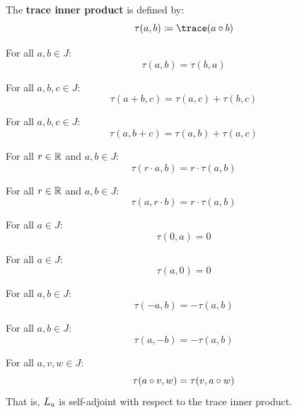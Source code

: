 \begin{definition}[traceInner]
The \textbf{trace inner product} is defined by:
\[ \tau(a, b) \defas \trace(a \jmul b) \]
\end{definition}

\begin{theorem}
For all $a, b \in J$:
\[ \tau(a, b) = \tau(b, a) \]
\end{theorem}

\begin{theorem}
For all $a, b, c \in J$:
\[ \tau(a + b, c) = \tau(a, c) + \tau(b, c) \]
\end{theorem}

\begin{theorem}
For all $a, b, c \in J$:
\[ \tau(a, b + c) = \tau(a, b) + \tau(a, c) \]
\end{theorem}

\begin{theorem}
For all $r \in \mathbb{R}$ and $a, b \in J$:
\[ \tau(r \cdot a, b) = r \cdot \tau(a, b) \]
\end{theorem}

\begin{theorem}
For all $r \in \mathbb{R}$ and $a, b \in J$:
\[ \tau(a, r \cdot b) = r \cdot \tau(a, b) \]
\end{theorem}

\begin{theorem}
For all $a \in J$:
\[ \tau(0, a) = 0 \]
\end{theorem}

\begin{theorem}
For all $a \in J$:
\[ \tau(a, 0) = 0 \]
\end{theorem}

\begin{theorem}
For all $a, b \in J$:
\[ \tau(-a, b) = -\tau(a, b) \]
\end{theorem}

\begin{theorem}
For all $a, b \in J$:
\[ \tau(a, -b) = -\tau(a, b) \]
\end{theorem}

\begin{theorem}
For all $a, v, w \in J$:
\[ \tau(a \circ v, w) = \tau(v, a \circ w) \]
That is, $L_{a}$ is self-adjoint with respect to the trace inner product.
\end{theorem}

